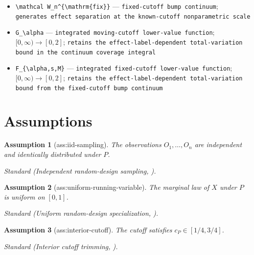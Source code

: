\documentclass{article}
\newtheorem{assumption}{Assumption}
\begin{document}
\begin{itemize}
  \item \texttt{\textbackslash{}\allowbreak{}mathcal W\_\allowbreak{}n\textasciicircum{}\{\textbackslash{}\allowbreak{}mathrm\{fix\}\allowbreak{}\}\allowbreak{}} --- \texttt{fixed-\allowbreak{}cutoff bump continuum}; \texttt{generates effect separation at the known-\allowbreak{}cutoff nonparametric scale}
  \item \texttt{G\_\allowbreak{}\textbackslash{}\allowbreak{}alpha} --- \texttt{integrated moving-\allowbreak{}cutoff lower-\allowbreak{}value function}; \([0,\infty)\to[0,2]\); \texttt{retains the effect-\allowbreak{}label-\allowbreak{}dependent total-\allowbreak{}variation bound in the continuum coverage integral}
  \item \texttt{F\_\allowbreak{}\{\textbackslash{}\allowbreak{}alpha,\allowbreak{}s,\allowbreak{}M\}\allowbreak{}} --- \texttt{integrated fixed-\allowbreak{}cutoff lower-\allowbreak{}value function}; \([0,\infty)\to[0,2]\); \texttt{retains the effect-\allowbreak{}label-\allowbreak{}dependent total-\allowbreak{}variation bound from the fixed-\allowbreak{}cutoff bump continuum}
\end{itemize}

\section{Assumptions}

\begin{assumption}[ass:iid-sampling]\label{ass:iid-sampling}
The observations \(O_1,\ldots,O_n\) are independent and identically distributed under \(P\).
\par\smallskip\noindent\emph{Standard} (Independent random-design sampling, \cite{NoackRothe2024}).
\end{assumption}

\begin{assumption}[ass:uniform-running-variable]\label{ass:uniform-running-variable}
The marginal law of \(X\) under \(P\) is uniform on \([0,1]\).
\par\smallskip\noindent\emph{Standard} (Uniform random-design specialization, \cite{PorterYu2015}).
\end{assumption}

\begin{assumption}[ass:interior-cutoff]\label{ass:interior-cutoff}
The cutoff satisfies \(c_P\in[1/4,3/4]\).
\par\smallskip\noindent\emph{Standard} (Interior cutoff trimming, \cite{PorterYu2015}).
\end{assumption}
\end{document}
